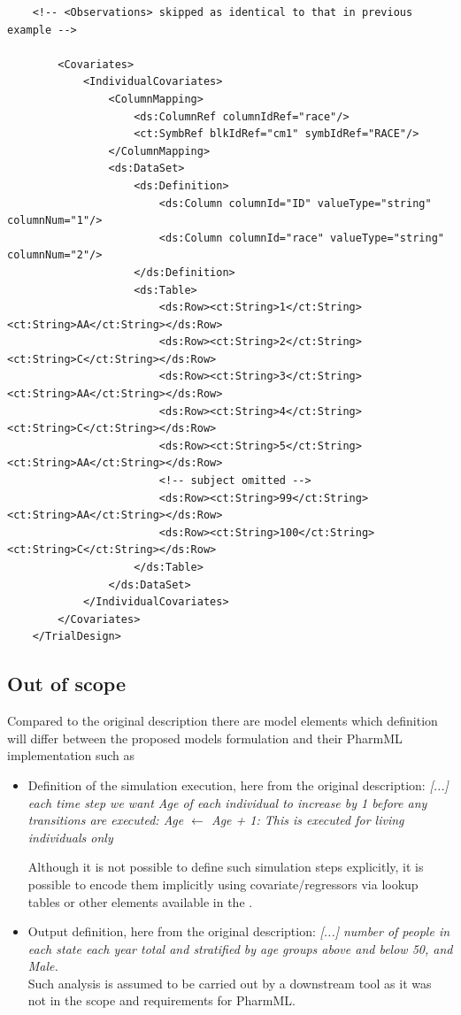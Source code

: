 \begin{itemize}
\begin{lstlisting}
	<!-- <Observations> skipped as identical to that in previous example -->
        
        <Covariates>
            <IndividualCovariates>
                <ColumnMapping>
                    <ds:ColumnRef columnIdRef="race"/>
                    <ct:SymbRef blkIdRef="cm1" symbIdRef="RACE"/>
                </ColumnMapping>
                <ds:DataSet>
                    <ds:Definition>
                        <ds:Column columnId="ID" valueType="string" columnNum="1"/>
                        <ds:Column columnId="race" valueType="string" columnNum="2"/>
                    </ds:Definition>
                    <ds:Table>
                        <ds:Row><ct:String>1</ct:String><ct:String>AA</ct:String></ds:Row>
                        <ds:Row><ct:String>2</ct:String><ct:String>C</ct:String></ds:Row>
                        <ds:Row><ct:String>3</ct:String><ct:String>AA</ct:String></ds:Row>
                        <ds:Row><ct:String>4</ct:String><ct:String>C</ct:String></ds:Row>
                        <ds:Row><ct:String>5</ct:String><ct:String>AA</ct:String></ds:Row>
                        <!-- subject omitted -->
                        <ds:Row><ct:String>99</ct:String><ct:String>AA</ct:String></ds:Row>
                        <ds:Row><ct:String>100</ct:String><ct:String>C</ct:String></ds:Row>
                    </ds:Table>
                </ds:DataSet>
            </IndividualCovariates>
        </Covariates>
    </TrialDesign>
\end{lstlisting}
\end{itemize}


\subsection*{Out of scope}
Compared to the original description there are model elements which 
definition will differ between the proposed models formulation and their  
PharmML implementation such as
\begin{itemize}
\item 
Definition of the simulation execution, here from the original description: \emph{ [...] each time 
step we want Age of each individual to increase by 1 before any transitions 
are executed: Age $\leftarrow$ Age + 1: This is executed for living individuals only}

Although it is not possible to define such simulation steps explicitly, it
is possible to encode them implicitly using covariate/regressors via lookup 
tables or other elements available in the . 
\item 
Output definition, here from the original description: \emph{[...] number of people in each 
state each year total and stratified by age groups above and below 50, and Male.} \\
Such analysis is assumed to be carried out by a downstream tool as it was 
not in the scope and requirements for PharmML.
\end{itemize}


